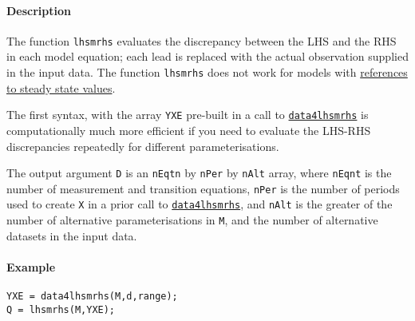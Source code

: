\paragraph{Description}\label{description}

The function \texttt{lhsmrhs} evaluates the discrepancy between the LHS
and the RHS in each model equation; each lead is replaced with the
actual observation supplied in the input data. The function
\texttt{lhsmrhs} does not work for models with
\href{modellang/sstateref}{references to steady state values}.

The first syntax, with the array \texttt{YXE} pre-built in a call to
\href{model/data4lhsmrhs}{\texttt{data4lhsmrhs}} is computationally much
more efficient if you need to evaluate the LHS-RHS discrepancies
repeatedly for different parameterisations.

The output argument \texttt{D} is an \texttt{nEqtn} by \texttt{nPer} by
\texttt{nAlt} array, where \texttt{nEqnt} is the number of measurement
and transition equations, \texttt{nPer} is the number of periods used to
create \texttt{X} in a prior call to
\href{model/data4lhsmrhs}{\texttt{data4lhsmrhs}}, and \texttt{nAlt} is
the greater of the number of alternative parameterisations in
\texttt{M}, and the number of alternative datasets in the input data.

\paragraph{Example}\label{example}

\begin{verbatim}
YXE = data4lhsmrhs(M,d,range);
Q = lhsmrhs(M,YXE);
\end{verbatim}


